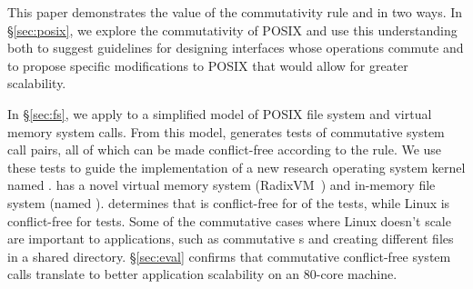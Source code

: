 This paper demonstrates the value of the commutativity rule and \tool
in two ways.
In \S\ref{sec:posix}, we explore the commutativity of POSIX
and use this
understanding both to suggest 
guidelines for designing interfaces
whose operations commute and
to propose specific modifications to POSIX
that would allow for greater scalability.

In \S\ref{sec:fs}, we apply \tool to a simplified model of
 POSIX file system and virtual memory system
calls.
%
From this model,
\tool generates  tests of commutative
system call pairs, all of which can be made conflict-free
according to the rule.  We use these tests to
guide the implementation of a new research operating system kernel
named \sys.  \sys has a novel virtual memory system
(RadixVM~\cite{clements:radixvm}) and in-memory file
system (named \fs).  \tool determines that \sys is conflict-free for
 of the
 tests, while Linux is conflict-free
for 
tests.  Some of the commutative cases where Linux doesn't scale are important
to applications, such as commutative
s and creating different files in a shared directory.
\S\ref{sec:eval} confirms that commutative conflict-free system calls
translate to better application scalability on an 80-core machine.




\begin{comment}
The contributions of the paper are as follows:
\begin{CompactItemize}

\item The commutativity rule;

\item The \tool{} tool;

\item \fs: a case study of using \tool to design a scalable file system;

\item A scalability evaluation with microbenchmarks and one application on an
  80-core machine.

\end{CompactItemize}
\end{comment}

